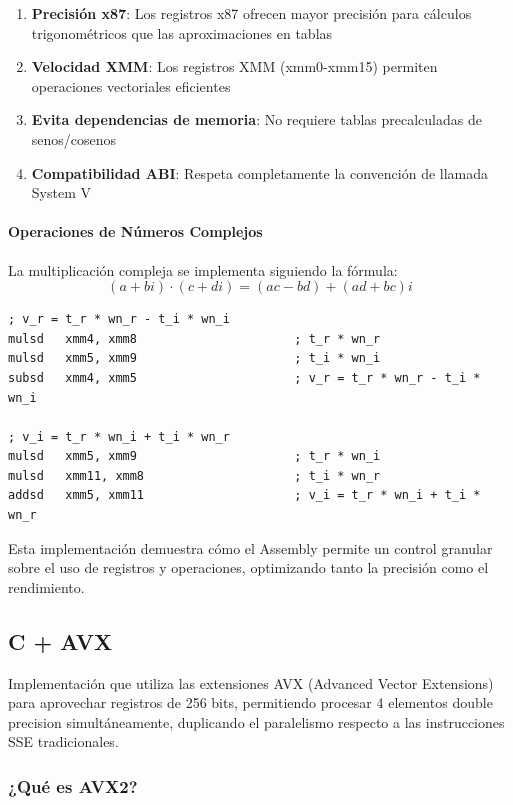 \documentclass[a4paper]{article}
\begin{document}
\begin{enumerate}
    \item \textbf{Precisión x87}: Los registros x87 ofrecen mayor precisión para cálculos trigonométricos que las aproximaciones en tablas
    \item \textbf{Velocidad XMM}: Los registros XMM (xmm0-xmm15) permiten operaciones vectoriales eficientes
    \item \textbf{Evita dependencias de memoria}: No requiere tablas precalculadas de senos/cosenos
    \item \textbf{Compatibilidad ABI}: Respeta completamente la convención de llamada System V
\end{enumerate}

\paragraph{Operaciones de Números Complejos}

La multiplicación compleja se implementa siguiendo la fórmula:
$$(a + bi) \cdot (c + di) = (ac - bd) + (ad + bc)i$$

\begin{verbatim}
; v_r = t_r * wn_r - t_i * wn_i
mulsd   xmm4, xmm8                      ; t_r * wn_r
mulsd   xmm5, xmm9                      ; t_i * wn_i
subsd   xmm4, xmm5                      ; v_r = t_r * wn_r - t_i * wn_i

; v_i = t_r * wn_i + t_i * wn_r
mulsd   xmm5, xmm9                      ; t_r * wn_i
mulsd   xmm11, xmm8                     ; t_i * wn_r
addsd   xmm5, xmm11                     ; v_i = t_r * wn_i + t_i * wn_r
\end{verbatim}

Esta implementación demuestra cómo el Assembly permite un control granular sobre el uso de registros y operaciones, optimizando tanto la precisión como el rendimiento.

\subsection{C + AVX}
Implementación que utiliza las extensiones AVX (Advanced Vector Extensions) para aprovechar registros de 256 bits, permitiendo procesar 4 elementos double precision simultáneamente,
duplicando el paralelismo respecto a las instrucciones SSE tradicionales.

\subsubsection{¿Qué es AVX2?}
\end{document}
